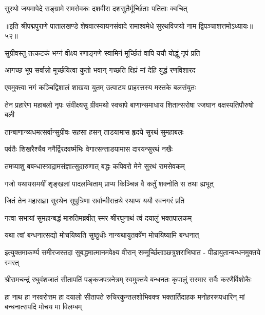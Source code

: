 \twolineshloka
{सुरथो जयमापेदे सङ्ग्रामे रामसेवकः}
{दशवीरा दशसुतैर्मूर्च्छिताः पतिताः क्वचित्}%

{॥इति श्रीपद्मपुराणे पातालखण्डे शेषवात्स्यायनसंवादे रामाश्वमेधे सुरथविजयो नाम द्विपञ्चाशत्तमोऽध्यायः॥५२॥}



\twolineshloka
{सुग्रीवस्तु तत्कटकं भग्नं वीक्ष्य रणाङ्गणे}
{स्वामिनं मूर्च्छितं वापि ययौ योद्धुं नृपं प्रति}%

\twolineshloka
{आगच्छ भूप सर्वान्नो मूर्च्छयित्वा कुतो भवान्}
{गच्छति क्षिप्रं मां देहि युद्धं रणविशारद}%

\twolineshloka
{एवमुक्त्वा नगं कञ्चिद्विशालं शाखया युतम्}
{उत्पाट्य प्राहरत्तस्य मस्तके बलसंयुतः}%

\fourlineindentedshloka
{तेन प्रहारेण महाबलो नृपः}
{संवीक्ष्यसु ग्रीवमथो स्वचापे}
{बाणान्समाधाय शितान्सरोषा}
{ज्जघान वक्षस्यतिपौरुषो बली}%

\twolineshloka
{तान्बाणान्व्यधमत्सर्वान्सुग्रीवः सहसा हसन्}
{ताडयामास हृदये सुरथं सुमहाबलः}%

\twolineshloka
{पर्वतैः शिखरैश्चैव नगैर्द्विरदवर्ष्मभिः}
{वेगात्सन्ताडयामास दारयन्सुरथं नखैः}%

\twolineshloka
{तमप्याशु बबन्धास्त्राद्रामसंज्ञात्सुदारुणात्}
{बद्धः कपिवरो मेने सुरथं रामसेवकम्}%

\twolineshloka
{गजो यथायसमयीं शृङ्खलां पादलम्बिताम्}
{प्राप्य किञ्चिन्न वै कर्तुं शक्नोति स तथा ह्यभूत्}%

\twolineshloka
{जितं तेन महाराज्ञा सुरथेन सुपुत्रिणा}
{सर्वान्वीरान्रथे स्थाप्य ययौ स्वनगरं प्रति}%

\twolineshloka
{गत्वा सभायां सुमहान्बद्धं मारुतिमब्रवीत्}
{स्मर श्रीरघुनाथं त्वं दयालुं भक्तपालकम्}%

\twolineshloka
{यथा त्वां बन्धनात्सद्यो मोचयिष्यति सुष्ठुधीः}
{नान्यथायुतवर्षेण मोचयिष्यामि बन्धनात्}%

\fourlineindentedshloka
{इत्युक्तमाकर्ण्य समीरजस्तदा}
{सुबद्धमात्मानमवेक्ष्य वीरान्}
{सम्मूर्च्छिताञ्छत्रुशराभिघात -}
{पीडायुतान्बन्धनमुक्तये स्मरत्}%

\twolineshloka
{श्रीरामचन्द्रं रघुवंशजातं सीतापतिं पङ्कजपत्रनेत्रम्}
{स्वमुक्तये बन्धनतः कृपालुं सस्मार सर्वैः करणैर्विशोकैः}%


\fourlineindentedshloka
{हा नाथ हा नरवरोत्तम हा दयालो}
{सीतापते रुचिरकुन्तलशोभिवक्त्र}
{भक्तार्तिदाहक मनोहररूपधारिन्}
{मां बन्धनात्सपदि मोचय मा विलम्बम्}%

